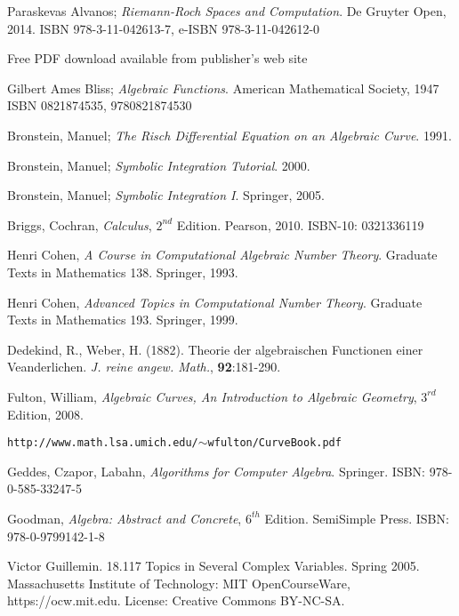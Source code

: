 

\begin{thebibliography}{9}

Paraskevas Alvanos;
{\it Riemann-Roch Spaces and Computation}.
De Gruyter Open, 2014.
ISBN 978-3-11-042613-7, e-ISBN 978-3-11-042612-0

Free PDF download available from publisher's web site

Gilbert Ames Bliss; {\it Algebraic Functions}. American Mathematical Society, 1947
ISBN 0821874535, 9780821874530

Bronstein, Manuel; {\it The Risch Differential Equation on an Algebraic Curve}. 1991.

Bronstein, Manuel; {\it Symbolic Integration Tutorial}. 2000.

Bronstein, Manuel; {\it Symbolic Integration I}. Springer, 2005.

Briggs, Cochran, {\it Calculus}, $2^{nd}$ Edition.  Pearson, 2010.  ISBN-10: 0321336119

 Henri Cohen, {\it A Course in Computational Algebraic Number Theory}.
  Graduate Texts in Mathematics 138. Springer, 1993.

 Henri Cohen, {\it Advanced Topics in Computational Number Theory}.
  Graduate Texts in Mathematics 193. Springer, 1999.

Dedekind, R., Weber, H. (1882). Theorie der algebraischen Functionen einer Veanderlichen.
{\it J. reine angew. Math.}, {\bf 92}:181-290.

Fulton, William, {\it Algebraic Curves, An Introduction to Algebraic Geometry}, $3^{rd}$ Edition, 2008.

{\tt http://www.math.lsa.umich.edu/$\sim$wfulton/CurveBook.pdf}

Geddes, Czapor, Labahn, {\it Algorithms for Computer Algebra}. Springer.
ISBN: 978-0-585-33247-5

Goodman, {\it Algebra: Abstract and Concrete}, $6^{th}$ Edition.  SemiSimple Press.
ISBN: 978-0-9799142-1-8

Victor Guillemin. 18.117 Topics in Several Complex Variables. Spring 2005. Massachusetts Institute of Technology: MIT OpenCourseWare, https://ocw.mit.edu. License: Creative Commons BY-NC-SA.


\end{thebibliography}
